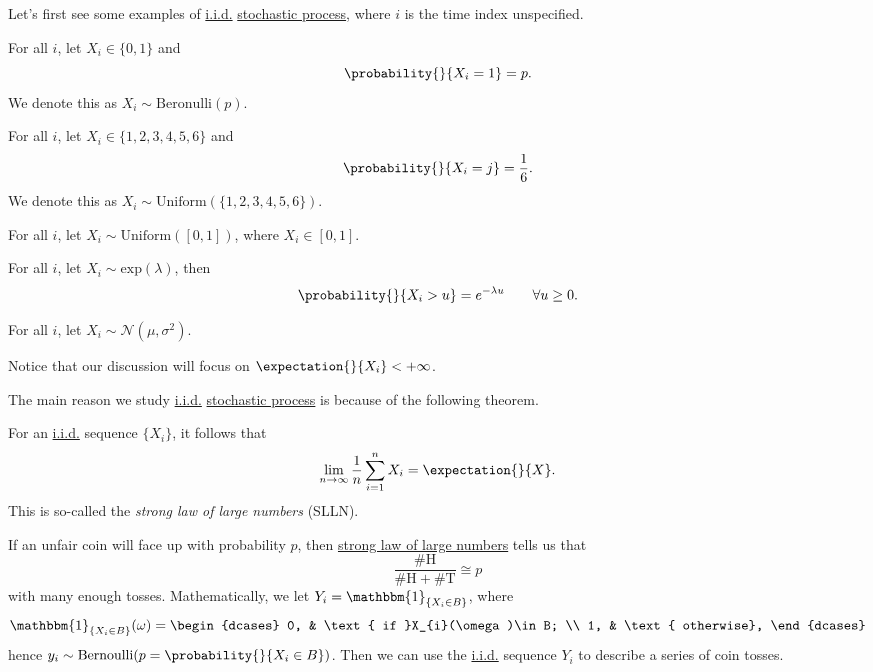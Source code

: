 Let's first see some examples of \hyperref[def:i.i.d.]{i.i.d.} \hyperref[def:stochastic-process]{stochastic process}, where \(i\) is the time index unspecified.
\begin{eg}
	For all \(i\), let \(X_{i}\in\{0, 1\}\) and
	\[
		\probability{}{X_{i} = 1} = p.
	\]
	We denote this as \(X_i\sim \mathrm{Beronulli}(p)\).
\end{eg}

\begin{eg}
	For all \(i\), let \(X_{i}\in\{1, 2, 3, 4, 5, 6\}\) and
	\[
		\probability{}{X_{i} = j} = \frac{1}{6}.
	\]
	We denote this as \(X_i\sim \mathrm{Uniform}(\{1, 2, 3, 4, 5, 6\})\).
\end{eg}

\begin{eg}
	For all \(i\), let \(X_i\sim \mathrm{Uniform}(\left[ 0, 1 \right] )\), where \(X_{i}\in\left[ 0, 1 \right] \).
\end{eg}

\begin{eg}
	For all \(i\), let \(X_i\sim \mathrm{exp}(\lambda)\), then
	\[
		\probability{}{X_{i}>u} = e^{-\lambda u}\qquad \forall u\geq 0.
	\]
\end{eg}

\begin{eg}
	For all \(i\), let \(X_i\sim \mathcal{N}(\mu, \sigma^2)\).
\end{eg}

\begin{remark}
	Notice that our discussion will focus on \(\expectation{}{X_i} < +\infty \).
\end{remark}

The main reason we study \hyperref[def:i.i.d.]{i.i.d.} \hyperref[def:stochastic-process]{stochastic process} is because of the following theorem.
\begin{theorem}\label{thm:SLLN}
	For an \hyperref[def:i.i.d.]{i.i.d.} sequence \(\{X_i\}\), it follows that
	\[
		\lim_{n \to \infty} \frac{1}{n}\sum\limits_{i=1}^{n} X_{i} = \expectation{}{X}.
	\]
	This is so-called the \emph{strong law of large numbers} (SLLN).
\end{theorem}

\begin{eg}
	If an unfair coin will face up with probability \(p\), then \hyperref[thm:SLLN]{strong law of large numbers} tells us that
	\[
		\frac{\# \mathrm{H} }{\# \mathrm{H} + \# \mathrm{T} } \cong p
	\]
	with many enough tosses. Mathematically, we let \(Y_{i} = \mathbbm{1}_{\{X_{i}\in B\}}\), where
	\[
		\mathbbm{1}_{\{X_{i}\in B\}}(\omega) = \begin{dcases}
			0, & \text{ if }X_{i}(\omega)\in B; \\
			1, & \text{ otherwise},
		\end{dcases}
	\]
	hence \(y_{i}\sim \mathrm{Bernoulli}(p = \probability{}{X_{i}\in B})\). Then we can use the \hyperref[def:i.i.d.]{i.i.d.} sequence \(Y_i\) to
	describe a series of coin tosses.
\end{eg}

